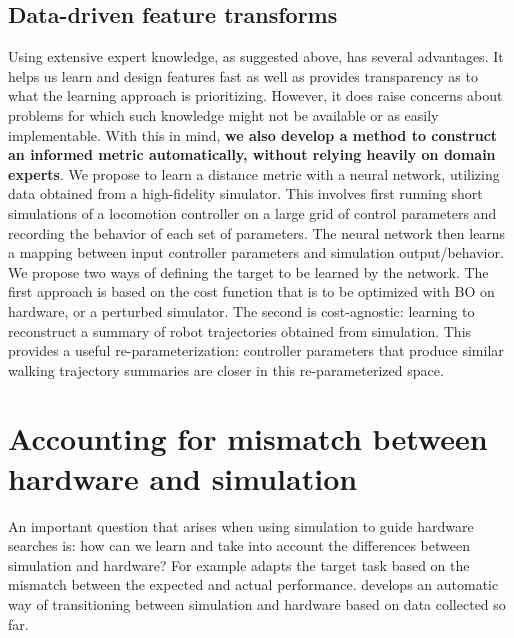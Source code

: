  \subsection{Data-driven feature transforms}
Using extensive expert knowledge, as suggested above, has several advantages. It helps us learn and design features fast as well as provides transparency as to what the learning approach is prioritizing. However, it does raise concerns about problems for which such knowledge might not be available or as easily implementable. With this in mind, \textbf{we also develop a method to construct an informed metric automatically, without relying heavily on domain experts}. We propose to learn a distance metric with a neural network, utilizing data obtained from a high-fidelity simulator. This involves first running short simulations of a locomotion controller on a large grid of control parameters and recording the behavior of each set of parameters. The neural network then learns a mapping between input controller parameters and simulation output/behavior. We propose two ways of defining the target to be learned by the network. The first approach is based on the cost function that is to be optimized with BO on hardware, or a perturbed simulator. The second is cost-agnostic: learning to reconstruct a summary of robot trajectories obtained from simulation. This provides a useful re-parameterization: controller parameters that produce similar walking trajectory summaries are closer in this re-parameterized space. 
 

\section{Accounting for mismatch between hardware and simulation}
 An important question that arises when using simulation to guide hardware searches is: how can we learn and take into account the differences between simulation and hardware? For example \cite{macalpine2016adaptation} adapts the target task based on the mismatch between the expected and actual performance. \cite{marco2017virtual} develops an automatic way of transitioning between simulation and hardware based on data collected so far. 
 
